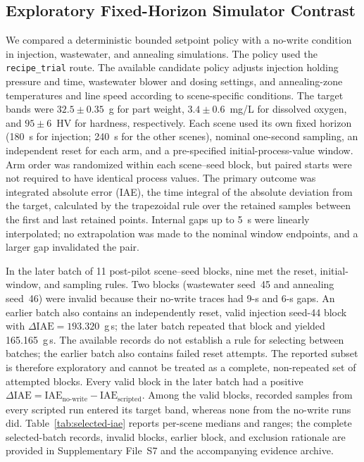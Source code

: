 \documentclass[journal]{IEEEtran}
\begin{document}
\subsection{Exploratory Fixed-Horizon Simulator Contrast}
\label{sec:eval-optimization}
We compared a deterministic bounded setpoint policy with a no-write condition in injection, wastewater, and annealing simulations. The policy used the \texttt{recipe\_trial} route. The available candidate policy adjusts injection holding pressure and time, wastewater blower and dosing settings, and annealing-zone temperatures and line speed according to scene-specific conditions. The target bands were $32.5\pm0.35$~g for part weight, $3.4\pm0.6$~mg/L for dissolved oxygen, and $95\pm6$~HV for hardness, respectively. Each scene used its own fixed horizon (180~s for injection; 240~s for the other scenes), nominal one-second sampling, an independent reset for each arm, and a pre-specified initial-process-value window. Arm order was randomized within each scene--seed block, but paired starts were not required to have identical process values. The primary outcome was integrated absolute error (IAE), the time integral of the absolute deviation from the target, calculated by the trapezoidal rule over the retained samples between the first and last retained points. Internal gaps up to 5~s were linearly interpolated; no extrapolation was made to the nominal window endpoints, and a larger gap invalidated the pair.

In the later batch of 11 post-pilot scene--seed blocks, nine met the reset, initial-window, and sampling rules. Two blocks (wastewater seed~45 and annealing seed~46) were invalid because their no-write traces had 9-s and 6-s gaps. An earlier batch also contains an independently reset, valid injection seed-44 block with $\Delta\mathrm{IAE}=193.320$~g\,s; the later batch repeated that block and yielded 165.165~g\,s. The available records do not establish a rule for selecting between batches; the earlier batch also contains failed reset attempts. The reported subset is therefore exploratory and cannot be treated as a complete, non-repeated set of attempted blocks. Every valid block in the later batch had a positive $\Delta\mathrm{IAE}=\mathrm{IAE}_{\mathrm{no\text{-}write}}-\mathrm{IAE}_{\mathrm{scripted}}$. Among the valid blocks, recorded samples from every scripted run entered its target band, whereas none from the no-write runs did. Table~\ref{tab:selected-iae} reports per-scene medians and ranges; the complete selected-batch records, invalid blocks, earlier block, and exclusion rationale are provided in Supplementary File~S7 and the accompanying evidence archive.
\end{document}
